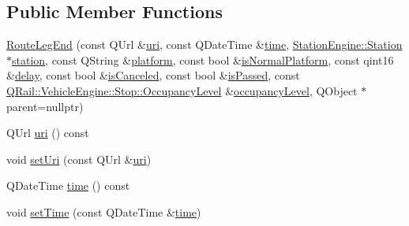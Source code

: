 \subsection*{Public Member Functions}
\begin{DoxyCompactItemize}
\item 
\mbox{\hyperlink{classQRail_1_1RouterEngine_1_1RouteLegEnd_a7eb21b6bdb3966a8954e1b870ae6e5ce}{Route\+Leg\+End}} (const Q\+Url \&\mbox{\hyperlink{classQRail_1_1RouterEngine_1_1RouteLegEnd_a8a2dca775ba3d184c8332cc2dfa06116}{uri}}, const Q\+Date\+Time \&\mbox{\hyperlink{classQRail_1_1RouterEngine_1_1RouteLegEnd_a43860044c99b5b278ac1adaabda8202e}{time}}, \mbox{\hyperlink{classQRail_1_1StationEngine_1_1Station}{Station\+Engine\+::\+Station}} $\ast$\mbox{\hyperlink{classQRail_1_1RouterEngine_1_1RouteLegEnd_a1b450f1785357c4a54178af375eded94}{station}}, const Q\+String \&\mbox{\hyperlink{classQRail_1_1RouterEngine_1_1RouteLegEnd_a717989d9bc8bc806cc09234b7259a060}{platform}}, const bool \&\mbox{\hyperlink{classQRail_1_1RouterEngine_1_1RouteLegEnd_a5338d1744cd3e938b192fb30d45cefca}{is\+Normal\+Platform}}, const qint16 \&\mbox{\hyperlink{classQRail_1_1RouterEngine_1_1RouteLegEnd_a3fa63ac9d26898a8424c785ea1468e23}{delay}}, const bool \&\mbox{\hyperlink{classQRail_1_1RouterEngine_1_1RouteLegEnd_a305be14990f34fd8a5864f1b9e8b967e}{is\+Canceled}}, const bool \&\mbox{\hyperlink{classQRail_1_1RouterEngine_1_1RouteLegEnd_a0ecabab3a1a0a3c5df1174ace72bb153}{is\+Passed}}, const \mbox{\hyperlink{classQRail_1_1VehicleEngine_1_1Stop_ad967ed81b19762bd582c1af07354a6d4}{Q\+Rail\+::\+Vehicle\+Engine\+::\+Stop\+::\+Occupancy\+Level}} \&\mbox{\hyperlink{classQRail_1_1RouterEngine_1_1RouteLegEnd_abd30361deee8efe206cd65444baf15c5}{occupancy\+Level}}, Q\+Object $\ast$parent=nullptr)
\item 
Q\+Url \mbox{\hyperlink{classQRail_1_1RouterEngine_1_1RouteLegEnd_a8a2dca775ba3d184c8332cc2dfa06116}{uri}} () const
\item 
void \mbox{\hyperlink{classQRail_1_1RouterEngine_1_1RouteLegEnd_a16bf169713e71878094b367eeec344e4}{set\+Uri}} (const Q\+Url \&\mbox{\hyperlink{classQRail_1_1RouterEngine_1_1RouteLegEnd_a8a2dca775ba3d184c8332cc2dfa06116}{uri}})
\item 
Q\+Date\+Time \mbox{\hyperlink{classQRail_1_1RouterEngine_1_1RouteLegEnd_a43860044c99b5b278ac1adaabda8202e}{time}} () const
\item 
void \mbox{\hyperlink{classQRail_1_1RouterEngine_1_1RouteLegEnd_a813fa90e96e978bbbbe2fe9b0c16a95d}{set\+Time}} (const Q\+Date\+Time \&\mbox{\hyperlink{classQRail_1_1RouterEngine_1_1RouteLegEnd_a43860044c99b5b278ac1adaabda8202e}{time}})

\end{DoxyCompactItemize}
